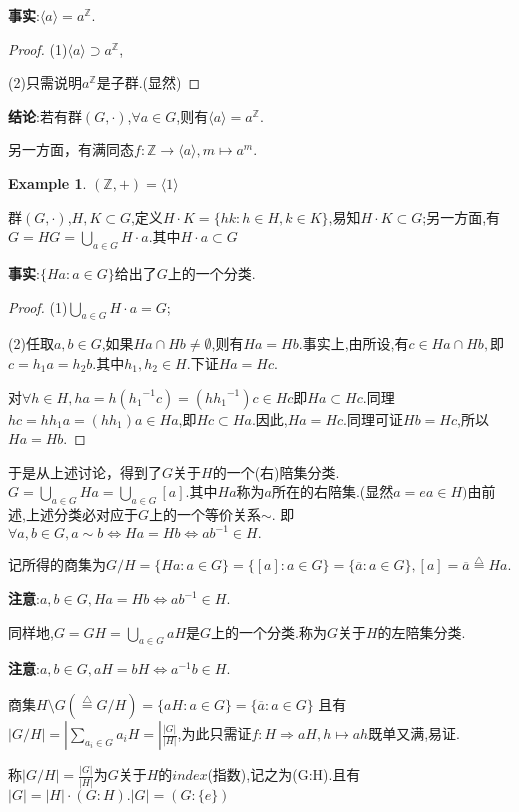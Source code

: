 \documentclass[UTF8]{article}
\newtheorem{exa}{Example}[section]
\begin{document}
\textbf{事实}:$\langle a\rangle=a^\mathbb{Z}$.
\begin{proof}
	(1)$\langle a\rangle\supset a^\mathbb{Z}$,
	
	(2)只需说明${a^\mathbb{Z}}$是子群.(显然)
\end{proof}
\textbf{结论}:若有群$(G,\cdot)$,$\forall a\in G$,则有$\langle a\rangle=a^\mathbb{Z}$.

另一方面，有满同态$f:\mathbb{Z}\to \langle a\rangle,m\mapsto a^m$.

\begin{exa}
	$(\mathbb{Z},+)=\langle 1\rangle$
\end{exa}

群$(G,\cdot)$,$H,K\subset G$,定义$H\cdot K=\{hk:h\in H,k\in K\}$,易知$H\cdot K\subset G$;另一方面,有$G=HG=\bigcup_{a\in G}H\cdot a$.其中$H\cdot a\subset G$

\textbf{事实}:$\{Ha:a\in G\}$给出了$G$上的一个分类.
\begin{proof}
	(1)$\bigcup_{a\in G}H\cdot a=G$;
	
	(2)任取$a,b\in G$,如果$Ha\cap Hb\ne \emptyset$,则有$Ha=Hb$.事实上,由所设,有$c\in Ha\cap Hb,$即$c=h_1a=h_2b.$其中$h_1,h_2\in H.$下证$Ha=Hc.$
	
	对$\forall h\in H,ha=h({h_1}^{-1}c)=(h{h_1}^{-1})c\in Hc$即$Ha\subset Hc.$同理$hc=hh_1a=(hh_1)a\in Ha$,即$Hc\subset Ha.$因此,$Ha=Hc.$同理可证$Hb=Hc$,所以$Ha=Hb$.
\end{proof}

于是从上述讨论，得到了$G$关于$H$的一个(右)陪集分类.$G=\bigcup_{a\in G}Ha=\bigcup_{a\in G}[a]$.其中$Ha$称为$a$所在的右陪集.(显然$a=ea\in H)$由前述,上述分类必对应于$G$上的一个等价关系$\sim$.
即$\forall a,b\in G,a\sim b\Leftrightarrow Ha=Hb\Leftrightarrow ab^{-1}\in H.$

记所得的商集为$G/H=\{Ha:a\in G\}=\{[a]:a\in G\}=\{\overline{a}:a\in G\},[a]=\overline{a}\stackrel{\bigtriangleup}{=}Ha.$

\textbf{注意}:$a,b\in G,Ha=Hb\Leftrightarrow ab^{-1}\in H.$

同样地,$G=GH=\bigcup_{a\in G}aH$是$G$上的一个分类.称为$G$关于$H$的左陪集分类.

\textbf{注意}:$a,b\in G,aH=bH\Leftrightarrow a^{-1}b\in H.$

商集$H\setminus G(\stackrel{\bigtriangleup}{=}G/H)=\{aH:a\in G\}=\{\overline{a}:a\in G\}$
且有$|G/H|=|\sum_{a_i\in G}{a_iH}=|\frac{|G|}{|H|}$,为此只需证$f:H\Rightarrow aH,h\mapsto ah$既单又满,易证.


称$|G/H|=\frac{|G|}{|H|}$为$G$关于$H$的$index$(指数),记之为(G:H).且有$|G|=|H|\cdot (G:H).|G|=(G:\{e\})$
\end{document}
